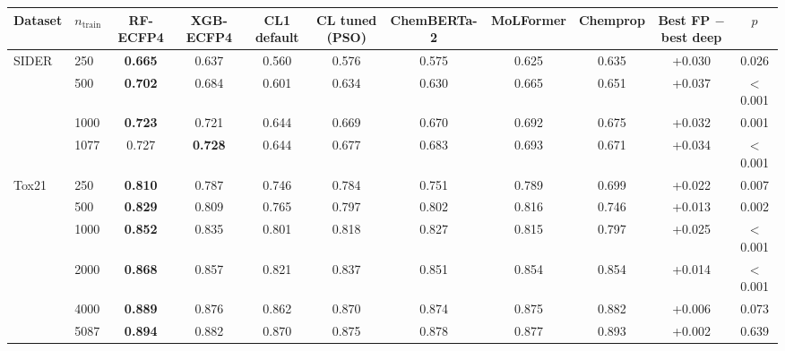 \begin{tabular}{llccccccccc}
\toprule
Dataset & $n_\mathrm{train}$ & RF-ECFP4 & XGB-ECFP4 & CL1 default & CL tuned (PSO) & ChemBERTa-2 & MoLFormer & Chemprop & Best FP $-$ best deep & $p$ \\
\midrule
SIDER & 250 & \textbf{0.665} & 0.637 & 0.560 & 0.576 & 0.575 & 0.625 & 0.635 & +0.030 & 0.026 \\
 & 500 & \textbf{0.702} & 0.684 & 0.601 & 0.634 & 0.630 & 0.665 & 0.651 & +0.037 & $<$0.001 \\
 & 1000 & \textbf{0.723} & 0.721 & 0.644 & 0.669 & 0.670 & 0.692 & 0.675 & +0.032 & 0.001 \\
 & 1077 & 0.727 & \textbf{0.728} & 0.644 & 0.677 & 0.683 & 0.693 & 0.671 & +0.034 & $<$0.001 \\
\midrule
Tox21 & 250 & \textbf{0.810} & 0.787 & 0.746 & 0.784 & 0.751 & 0.789 & 0.699 & +0.022 & 0.007 \\
 & 500 & \textbf{0.829} & 0.809 & 0.765 & 0.797 & 0.802 & 0.816 & 0.746 & +0.013 & 0.002 \\
 & 1000 & \textbf{0.852} & 0.835 & 0.801 & 0.818 & 0.827 & 0.815 & 0.797 & +0.025 & $<$0.001 \\
 & 2000 & \textbf{0.868} & 0.857 & 0.821 & 0.837 & 0.851 & 0.854 & 0.854 & +0.014 & $<$0.001 \\
 & 4000 & \textbf{0.889} & 0.876 & 0.862 & 0.870 & 0.874 & 0.875 & 0.882 & +0.006 & 0.073 \\
 & 5087 & \textbf{0.894} & 0.882 & 0.870 & 0.875 & 0.878 & 0.877 & 0.893 & +0.002 & 0.639 \\
\bottomrule
\end{tabular}